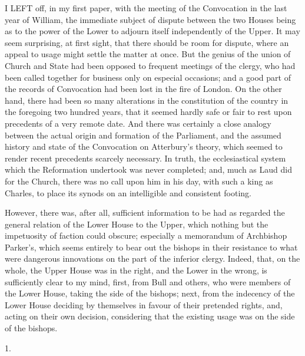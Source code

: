 
I LEFT
off, in my first paper, with the meeting of the Convocation in the
last year of William, the immediate subject of dispute between the two
Houses being as to the power of the Lower to adjourn itself
independently of the Upper. It may seem surprising, at first sight,
that there should be room for dispute, where an appeal to usage might
settle the matter at once. But the genius of the union of Church and
State had been opposed to frequent meetings of the clergy, who had
been called together for business only on especial occasions; and a
good part of the records of Convocation had been lost in the fire of
London. On the other hand, there had been so many alterations in the
constitution of the country in the foregoing two hundred years, that
it seemed hardly safe or fair to rest upon precedents of a very remote
date. And there was certainly a close analogy between the actual
origin and formation of the Parliament, and the assumed history and
state of the Convocation on Atterbury's theory, which seemed to render
recent precedents scarcely necessary. In truth, the ecclesiastical
system which the Reformation undertook was never completed; and, much
as Laud did for the Church, there was no call upon him in his day,
with such a king as Charles, to place its synods on an intelligible
and consistent footing.

However, there was, after all,
sufficient information to be had as regarded the general relation of
the Lower House to the Upper, which nothing but the impetuosity
of faction could obscure; especially a memorandum of Archbishop Parker's,
which seems entirely to bear out the bishops in their resistance to
what were dangerous innovations on the part of the inferior clergy.
Indeed, that, on the whole, the Upper House was in the right, and the
Lower in the wrong, is sufficiently clear to my mind, first, from Bull
and others, who were members of the Lower House, taking the side of
the bishops; next, from the indecency of the Lower House deciding by
themselves in favour of their pretended rights, and, acting on their
own decision, considering that the existing usage was on the side of
the bishops.

1.


